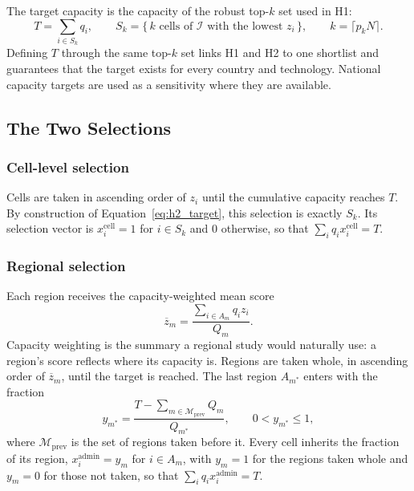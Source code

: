 The target capacity is the capacity of the robust top-$k$ set used in H1:
\begin{equation}
    T=\sum_{i\in S_k}q_i,
    \qquad
    S_k=\{\,k \text{ cells of } \mathcal{I} \text{ with the lowest } z_i\,\},
    \qquad
    k=\lceil p_k N\rceil .
    \label{eq:h2_target}
\end{equation}
Defining $T$ through the same top-$k$ set links H1 and H2 to one shortlist and
guarantees that the target exists for every country and technology. National
capacity targets are used as a sensitivity where they are available.

\subsection{The Two Selections}
\label{subsec:h2_selections}

\subsubsection{Cell-level selection}

Cells are taken in ascending order of $z_i$ until the cumulative capacity
reaches $T$. By construction of Equation~\ref{eq:h2_target}, this selection is
exactly $S_k$. Its selection vector is $x^{\mathrm{cell}}_i=1$ for $i\in S_k$
and $0$ otherwise, so that $\sum_i q_i x^{\mathrm{cell}}_i=T$.

\subsubsection{Regional selection}

Each region receives the capacity-weighted mean score
\begin{equation}
    \overline{z}_m=\frac{\sum_{i\in A_m}q_i z_i}{Q_m}.
    \label{eq:h2_region_score}
\end{equation}
Capacity weighting is the summary a regional study would naturally use: a
region's score reflects where its capacity is. Regions are taken whole, in
ascending order of $\overline{z}_m$, until the target is reached. The last
region $A_{m^{*}}$ enters with the fraction
\begin{equation}
    y_{m^{*}}=\frac{T-\sum_{m\in\mathcal{M}_{\mathrm{prev}}}Q_m}{Q_{m^{*}}},
    \qquad 0<y_{m^{*}}\leq 1,
    \label{eq:h2_fractional_region}
\end{equation}
where $\mathcal{M}_{\mathrm{prev}}$ is the set of regions taken before it. Every
cell inherits the fraction of its region, $x^{\mathrm{admin}}_i=y_m$ for
$i\in A_m$, with $y_m=1$ for the regions taken whole and $y_m=0$ for those not
taken, so that $\sum_i q_i x^{\mathrm{admin}}_i=T$.

